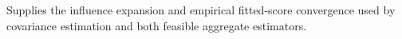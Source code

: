 Supplies the influence expansion and empirical fitted-score convergence used by covariance estimation and both feasible aggregate estimators.
